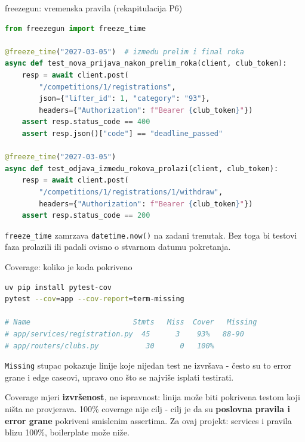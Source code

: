\begin{frame}[fragile,shrink=5]{freezegun: vremenska pravila (rekapitulacija P6)}
\begin{lstlisting}[language=python]
from freezegun import freeze_time

@freeze_time("2027-03-05")  # izmedu prelim i final roka
async def test_nova_prijava_nakon_prelim_roka(client, club_token):
    resp = await client.post(
        "/competitions/1/registrations",
        json={"lifter_id": 1, "category": "93"},
        headers={"Authorization": f"Bearer {club_token}"})
    assert resp.status_code == 400
    assert resp.json()["code"] == "deadline_passed"

@freeze_time("2027-03-05")
async def test_odjava_izmedu_rokova_prolazi(client, club_token):
    resp = await client.post(
        "/competitions/1/registrations/1/withdraw",
        headers={"Authorization": f"Bearer {club_token}"})
    assert resp.status_code == 200
\end{lstlisting}

\vspace{0.4em}
\texttt{freeze\_time} zamrzava \texttt{datetime.now()} na zadani trenutak. Bez toga bi testovi faza prolazili ili padali ovisno o stvarnom datumu pokretanja.
\end{frame}

\begin{frame}[fragile,shrink=5]{Coverage: koliko je koda pokriveno}
\begin{lstlisting}[language=bash]
uv pip install pytest-cov
pytest --cov=app --cov-report=term-missing

# Name                        Stmts   Miss  Cover   Missing
# app/services/registration.py  45      3    93%   88-90
# app/routers/clubs.py           30      0   100%
\end{lstlisting}

\vspace{0.4em}
\texttt{Missing} stupac pokazuje linije koje nijedan test ne izvršava - često su to error grane i edge caseovi, upravo ono što se najviše isplati testirati.

\vspace{0.6em}
Coverage mjeri \textbf{izvršenost}, ne ispravnost: linija može biti pokrivena testom koji ništa ne provjerava. 100\% coverage nije cilj - cilj je da su \textbf{poslovna pravila i error grane} pokriveni smislenim assertima. Za ovaj projekt: services i pravila blizu 100\%, boilerplate može niže.
\end{frame}

